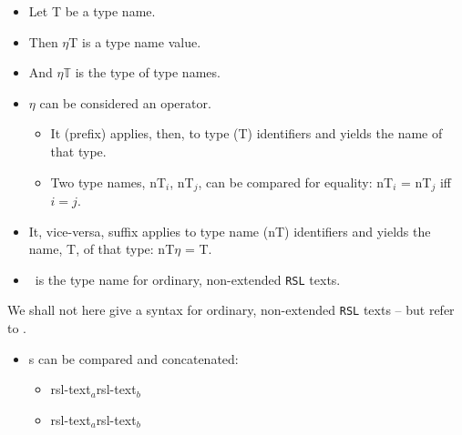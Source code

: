 

\begin{itemize}
\item Let \textsf{T} be a type name.
\item Then \textsf{$\eta$T} is a type name
  value.
\item And \textsf{$\eta\mathbb{T}$} is the type of type names.
\end{itemize}


\begin{itemize}
\item $\eta$ can be considered an operator.
\begin{itemize} 
\item It (prefix) applies, then, to type (\textsf{T})
      identifiers and yields the name of that type.
\item Two type names, \textsf{nT$_i$, nT$_j$}, can be compared for
      equality: \textsf{nT$_i$ = nT$_j$} iff $i=j$.
\end{itemize}
\item It, vice-versa, suffix  applies to type name (\textsf{nT})
      identifiers and yields the name, \textsf{T}, of that type: \textsf{nT$\eta$ = T}.
\end{itemize}

\nbbbb{\rsltxt}

\begin{itemize}
\item \rsltxt\ is the type name for ordinary, non-extended \texttt{RSL} texts.
\end{itemize}

\noindent
\begynd
\pind We shall not here give a syntax for ordinary, non-extended
      \texttt{RSL} texts -- but refer to \cite{RSL}.
\afslut


\begin{itemize}
\item {\rsltxt}s can be compared and concatenated:
\begin{itemize}
\item \textsf{rsl-text$_a$}{\EQ}\textsf{rsl-text$_b$}
\item \textsf{rsl-text$_a$}{\CONCAT}\textsf{rsl-text$_b$}
\end{itemize}
\end{itemize}


